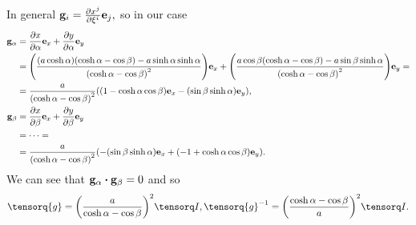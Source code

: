 \documentclass[../main.tex]{subfiles}
\begin{document}
In general $\vb{g}_i=\pdv{x^j}{\xi^i}\vb{e}_j,$ so in our case
\begin{align*}
	\vb{g}_{\alpha}&=\pdv{x}{\alpha}\vb{e}_x+\pdv{y}{\alpha}\vb{e}_y\\
		       &=\qty(\frac{(a \cosh \alpha)(\cosh \alpha-\cos \beta)-a \sinh \alpha\sinh \alpha}{\qty(\cosh \alpha - \cos \beta)^{2}})\vb{e}_x+\qty(\frac{a \cos \beta(\cosh \alpha-\cos \beta)-a \sin \beta \sinh \alpha}{\qty(\cosh \alpha - \cos \beta)^{2}})\vb{e}_y = \\
		       & = \frac{a}{\qty(\cosh \alpha - \cos \beta)^{2}}\qty((1-\cosh \alpha \cos \beta)\vb{e}_x-(\sin \beta \sinh \alpha) \vb{e}_y),\\
	\vb{g}_{\beta}& = \pdv{x}{\beta}\vb{e}_x+\pdv{y}{\beta}\vb{e}_y\\
		      &= \dots =\\
		      &= \frac{a}{\qty(\cosh \alpha-\cos \beta)^{2}}\qty(-\qty(\sin \beta \sinh \alpha)\vb{e}_x + \qty(-1+\cosh \alpha \cos \beta)\vb{e}_y).
\end{align*}
We can see that $\vb{g}_{\alpha} \vdot \vb{g}_{\beta}=0$ and so
\[
	\tensorq{g}=\qty(\frac{a}{\cosh \alpha - \cos \beta})^{2}\identity, \inverse{\tensorq{g}} = \qty(\frac{\cosh \alpha-\cos \beta}{a})^{2} \identity.
\]
\end{document}

